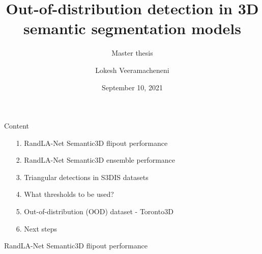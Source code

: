 \documentclass[aspectratio=169]{beamer}
\author[]{Lokesh Veeramacheneni}
\title{Out-of-distribution detection in 3D semantic segmentation models}
\subtitle{Master thesis}
\institute[HBRS]{Hochschule Bonn-Rhein-Sieg}
\date{September 10, 2021}
\begin{document}
{
\begin{frame}
\titlepage
\end{frame}
}

\begin{frame}{Content}
    \begin{itemize}
        \item[1.] RandLA-Net Semantic3D flipout performance
        \item[2.] RandLA-Net Semantic3D ensemble performance
        \item[3.] Triangular detections in S3DIS datasets
        \item[4.] What thresholds to be used?
        \item[5.] Out-of-distribution (OOD) dataset - Toronto3D 
        \item[6.] Next steps
    \end{itemize}
\end{frame}

\begin{frame}{RandLA-Net Semantic3D flipout performance}
    \begin{table}[h!]
        \caption{Illustration of performance of RandLA-Net on Semantic3D over flipout initalized with variance 1. meanIOU and IOU per class and overall accuracy are represented here.
        C1 to C8 are the classes of Semantic3D which are Manmadeterrain, Naturalterrain, Highvegetation, Lowvegetation, Buildings, Hardscapes, Scanningartifacts, and Cars.}
        \label{tab:flipout_eval}
    \end{table}
\end{frame}
\end{document}
